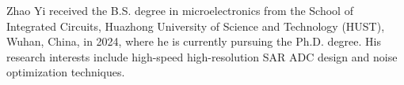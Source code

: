 \documentclass[journal]{IEEEtran}
\begin{document}
\IEEEpubidadjcol

\begin{IEEEbiography}{Zhao Yi} received the B.S. degree in microelectronics from the School of Integrated Circuits, Huazhong University of Science and Technology (HUST), Wuhan, China, in 2024, where he is currently pursuing the Ph.D. degree. His research interests include high-speed high-resolution SAR ADC design and noise optimization techniques.
\end{IEEEbiography}



\end{document}
